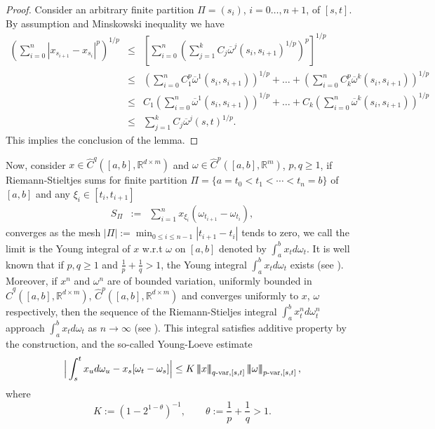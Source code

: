 \documentclass[10pt]{article}
\numberwithin{equation}{section} %
\newcommand{\R}{\ensuremath{\mathbb{R}}}
\newcommand{\ltn}{\ensuremath{\left| \! \left| \! \left|}}
\newcommand{\rtn}{\ensuremath{\right| \! \right| \! \right|}}
\begin{document}
\begin{proof}
Consider an arbitrary finite partition $\Pi = (s_i)$, $i=0\ldots, n+1$, of $[s,t]$. By assumption and Minskowski inequality we have
\begin{eqnarray*}
\left(\sum_{i=0}^n|x_{s_{i+1}}-x_{s_i}|^p\right)^{1/p}&\leq & \left[\sum_{i=0}^n\left(\sum_{j=1}^k C_j \overline{\omega}^j(s_i,s_{i+1})^{1/p}\right)^p\right]^{1/p}\\
&\leq & \left(\sum_{i=0}^n C_1^p\overline{\omega}^1(s_i,s_{i+1})\right)^{1/p}+\dots+ \left(\sum_{i=0}^nC_k^p\overline{\omega}^k(s_i,s_{i+1})\right)^{1/p} \\
&\leq &  C_1 \left(\sum_{i=0}^n\overline{\omega}^1(s_i,s_{i+1})\right)^{1/p}+\dots+ C_k\left(\sum_{i=0}^n\overline{\omega}^k(s_i,s_{i+1})\right)^{1/p} \\
&\leq & \sum_{j=1}^k C_j  \overline{\omega}^j(s,t)^{1/p}.
\end{eqnarray*}
This implies the conclusion of the lemma.
\end{proof}

Now, consider $x\in \widehat{C}^{q}([a,b],\R^{d\times m})$ and $\omega\in \widehat{C}^p([a,b],\R^m)$, $p,q \geq 1$, if Riemann-Stieltjes sums for finite partition $\Pi=\{ a=t_0<t_1<\cdots < t_n=b \}$ of $[a,b]$ and any $\xi_i \in [t_i,t_{i+1}]$
\begin{eqnarray}\label{RSdef}
S_\Pi &:=& \sum_{i=1}^n x_{\xi_i}(\omega_{t_{i+1}}-\omega_{t_i}) ,
\end{eqnarray}
converges as the mesh $|\Pi| := \displaystyle\min_{0\leq i \leq n-1} |t_{i+1}-t_i|$  tends to zero, we call the limit is the Young integral of $x$ w.r.t $\omega$ on $[a,b]$ denoted by $\int_a^b x_td\omega_t$.
It is well known that if $p,q\geq 1$ and $\frac{1}{p}+\frac{1}{q}  > 1$, the Young integral $\int_a^bx_td\omega_t$ exists (see \cite[p.\ 264--265]{young}). 
Moreover, if $x^n$ and $\omega^n$ are of bounded variation, uniformly bounded in  $\widehat{C}^q([a,b],\R^{d\times m})$,  $\widehat{C}^p([a,b],\R^{d\times m})$ and  converges uniformly to $x$, $\omega$ respectively, then the sequence of the Riemann-Stieljes integral $\int_a^b x^n_td\omega^n_t$ approach $\int_a^bx_td\omega_t$ as $n\to \infty$ (see \cite{friz}). This integral satisfies additive property by the construction, and the so-called Young-Loeve estimate \cite[Theorem 6.8, p.\ 116]{friz}
\begin{equation}\label{YL0}
\Big|\int_s^t x_ud\omega_u-x_s[\omega_t-\omega_s]\Big| \leq K \ltn x\rtn_{q\text{-var},[s,t]} \ltn\omega\rtn_{p\text{-var},[s,t]},
\end{equation}
where 
\begin{equation}\label{constK}
K:=(1-2^{1-\theta})^{-1},\qquad \theta := \frac{1}{p} + \frac{1}{q} >1.
\end{equation}
\end{document}
